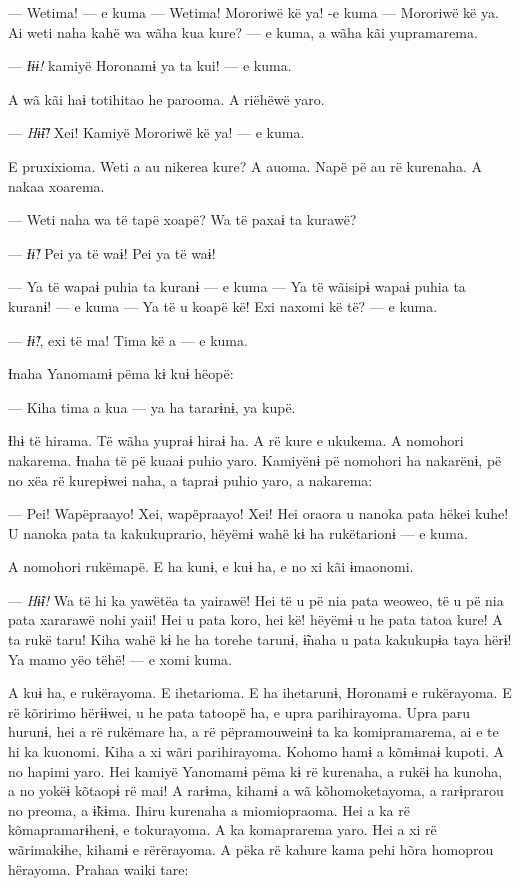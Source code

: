 --- Wetima! --- e kuma --- Wetima! Mororiwë kë ya! -e kuma --- Mororiwë kë
ya. Ai weti naha kahë wa wãha kua kure? --- e kuma, a wãha kãi
yupramarema. 

--- \textit{Ɨɨɨ!} kamiyë Horonamɨ ya ta kui! --- e kuma. 

A wã kãi haɨ totihitao he parooma. A riëhëwë yaro. 

--- \textit{Hɨ̃ɨ̃!} Xei! Kamiyë Mororiwë kë ya! --- e kuma. 

E pruxixioma. Weti a au nikerea kure? A auoma. Napë pë au rë kurenaha. A nakaa xoarema. 

--- Weti naha wa të tapë xoapë? Wa të paxaɨ ta kurawë? 

--- \textit{Ɨɨ̃!} Pei ya të waɨ! Pei ya të waɨ! 

--- Ya të wapaɨ puhia ta kuranɨ --- e kuma --- Ya të wãisipɨ wapaɨ puhia ta
kuranɨ! --- e kuma --- Ya të u koapë kë! Exi naxomi kë të? --- e kuma. 

--- \textit{Ɨɨ̃!}, exi të ma! Tima kë a --- e kuma. 

Ɨnaha Yanomamɨ pëma kɨ kuɨ hëopë: 

--- Kiha tima a kua --- ya ha tararɨnɨ, ya kupë. 

Ɨhɨ të hirama. Të wãha yupraɨ hiraɨ ha. A rë kure e ukukema. A nomohori
nakarema. Ɨnaha të pë kuaaɨ puhio yaro. Kamiyënɨ pë nomohori ha
nakarënɨ, pë no xëa rë kurepɨwei naha, a tapraɨ puhio yaro, a nakarema: 

--- Pei! Wapëpraayo! Xei, wapëpraayo! Xei! Hei oraora u nanoka pata hëkei
kuhe! U nanoka pata ta kakukuprario, hëyëmɨ wahë kɨ ha rukëtarionɨ --- e
kuma. 

A nomohori rukëmapë. E ha kunɨ, e kuɨ ha, e no xi kãi ɨmaonomi. 

--- \textit{Hɨ̃ɨ!} Wa të hi ka yawëtëa ta yairawë! Hei të u pë nia pata weoweo, të u
pë nia pata xararawë nohi yaii! Hei u pata koro, hei kë! hëyëmɨ u he
pata tatoa kure! A ta rukë taru! Kiha wahë kɨ he ha torehe tarunɨ, ɨ̃naha
u pata kakukupɨa taya hërɨ! Ya mamo yëo tëhë! --- e xomi kuma. 

A kuɨ ha, e rukërayoma. E ihetarioma. E ha ihetarunɨ, Horonamɨ e
rukërayoma. E rë kõririmo hërɨɨwei, u he pata tatoopë ha, e upra
parihirayoma. Upra paru hurunɨ, hei a rë rukëmare ha, a rë pëpramouweinɨ
ta ka komipramarema, ai e te hi ka kuonomi. Kiha a xi wãri parihirayoma.
Kohomo hamɨ a kõmɨmaɨ kupoti. A no hapimi yaro. Hei kamiyë Yanomamɨ pëma
kɨ rë kurenaha, a rukëɨ ha kunoha, a no yokëɨ kõtaopɨ rë mai! A rarɨma,
kihamɨ a wã kõhomoketayoma, a rarɨprarou no preoma, a ɨ̃kɨma. Ihiru
kurenaha a miomiopraoma. Hei a ka rë kõmapramarɨhenɨ, e tokurayoma. A ka
komaprarema yaro. Hei a xi rë wãrimakɨhe, kihamɨ e rërërayoma. A pëka rë
kahure kama pehi hõra homoprou hërayoma. Prahaa waiki tare: 

